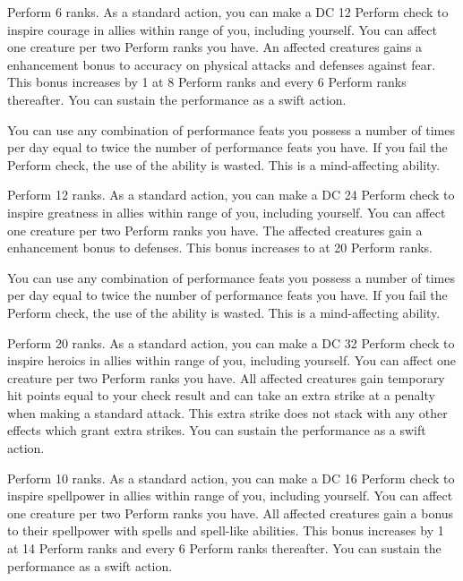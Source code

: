 \featpre Perform 6 ranks.
\featben As a standard action, you can make a DC 12 Perform check to inspire courage in allies within \rngmed range of you, including yourself.
You can affect one creature per two Perform ranks you have.
An affected creatures gains a  enhancement bonus to accuracy on physical attacks and defenses against fear.
This bonus increases by 1 at 8 Perform ranks and every 6 Perform ranks thereafter.
You can sustain the performance as a swift action.

You can use any combination of performance feats you possess a number of times per day equal to twice the number of performance feats you have.
If you fail the Perform check, the use of the ability is wasted.
This is a mind-affecting ability.

\featpre Perform 12 ranks.
\featben As a standard action, you can make a DC 24 Perform check to inspire greatness in allies within \rngmed range of you, including yourself.
You can affect one creature per two Perform ranks you have.
The affected creatures gain a  enhancement bonus to defenses.
This bonus increases to  at 20 Perform ranks.

You can use any combination of performance feats you possess a number of times per day equal to twice the number of performance feats you have.
If you fail the Perform check, the use of the ability is wasted.
This is a mind-affecting ability.

\featpre Perform 20 ranks.
\featben As a standard action, you can make a DC 32 Perform check to inspire heroics in allies within \rngmed range of you, including yourself.
You can affect one creature per two Perform ranks you have.
All affected creatures gain temporary hit points equal to your check result and can take an extra strike at a  penalty when making a standard attack.
This extra strike does not stack with any other effects which grant extra strikes.
You can sustain the performance as a swift action.

\featpre Perform 10 ranks.
\featben As a standard action, you can make a DC 16 Perform check to inspire spellpower in allies within \rngmed range of you, including yourself.
You can affect one creature per two Perform ranks you have.
All affected creatures gain a  bonus to their spellpower with spells and spell-like abilities.
This bonus increases by 1 at 14 Perform ranks and every 6 Perform ranks thereafter.
You can sustain the performance as a swift action.

